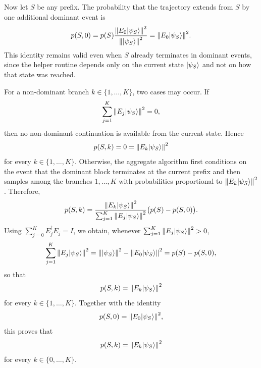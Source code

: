 \documentclass[showpacs,amsmath,amssymb,twocolumn,prx,superscriptaddress,10pt,aps,nofootinbib]{revtex4-2}
\DeclarePairedDelimiter\ket{|}{\rangle}
\begin{document}
Now let $S$ be any prefix. The probability that the trajectory extends from $S$ by one additional dominant event is
\begin{equation}
    p(S,0) = p(S) \frac{\norm{E_0 \ket{\psi_S}}^2}{\norm{\ket{\psi_S}}^2} = \norm{E_0 \ket{\psi_S}}^2.
\end{equation}
This identity remains valid even when $S$ already terminates in dominant events, since the helper routine depends only on the current state $\ket{\psi_S}$ and not on how that state was reached.

For a non-dominant branch $k\in\{1,\ldots,K\}$, two cases may occur. If
\begin{equation}
    \sum_{j=1}^{K} \norm{E_j\ket{\psi_S}}^2 = 0,
\end{equation}
then no non-dominant continuation is available from the current state. Hence
\begin{equation}
    p(S,k)=0=\norm{E_k\ket{\psi_S}}^2
\end{equation}
for every $k\in\{1,\ldots,K\}$. Otherwise, the aggregate algorithm first
conditions on the event that the dominant block terminates at the current
prefix and then samples among the branches $1,\ldots,K$ with probabilities
proportional to $\norm{E_k\ket{\psi_S}}^2$. Therefore,
\begin{equation}
    p(S,k) =
    \frac{\norm{E_k \ket{\psi_S}}^2}{\sum_{j=1}^{K} \norm{E_j \ket{\psi_S}}^2}
    \bigl(p(S)-p(S,0)\bigr).
\end{equation}
Using $\sum_{j=0}^{K} E_j^{\dagger}E_j = I$, we obtain, whenever
$\sum_{j=1}^{K}\norm{E_j\ket{\psi_S}}^2>0$,
\begin{equation}
    \sum_{j=1}^{K} \norm{E_j \ket{\psi_S}}^2
    = \norm{\ket{\psi_S}}^2 - \norm{E_0 \ket{\psi_S}}^2
    = p(S)-p(S,0),
\end{equation}
so that
\begin{equation}
    p(S,k)=\norm{E_k\ket{\psi_S}}^2
\end{equation}
for every $k\in\{1,\ldots,K\}$. Together with the identity
\begin{equation}
    p(S,0)=\norm{E_0\ket{\psi_S}}^2,
\end{equation}
this proves that
\begin{equation}
    p(S,k)=\norm{E_k\ket{\psi_S}}^2
\end{equation}
for every $k\in\{0,\ldots,K\}$.



\end{document}
